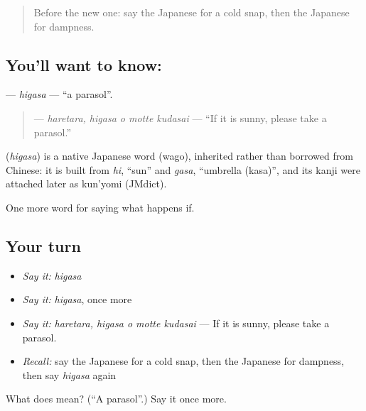 \label{lesson:JA-C354-higasa}



\begin{quote}
Before the new one: say the Japanese for a cold snap, then the Japanese for dampness.
\end{quote}

\subsection*{You'll want to know: }
\textbf{} — \emph{higasa} — \textquotedblleft{}a parasol\textquotedblright{}.

\begin{quote}
\textbf{  } — \emph{haretara, higasa o motte kudasai} — \textquotedblleft{}If it is sunny, please take a parasol.\textquotedblright{}
\end{quote}

\begin{cousinweb}
\textbf{} (\emph{higasa}) is a native Japanese word (wago), inherited rather than borrowed from Chinese: it is built from \emph{hi}, \textquotedblleft{}sun\textquotedblright{} and \emph{gasa}, \textquotedblleft{}umbrella (kasa)\textquotedblright{}, and its kanji were attached later as kun'yomi (JMdict).
\end{cousinweb}

\begin{grammarlens}[title={What you've built}]
One more word for saying what happens if.
\end{grammarlens}

\subsection*{Your turn}
\begin{itemize}
\raggedright
  \item \emph{Say it:} \emph{higasa}
  \item \emph{Say it:} \emph{higasa}, once more
  \item \emph{Say it:} \emph{haretara, higasa o motte kudasai} — If it is sunny, please take a parasol.
  \item \emph{Recall:} say the Japanese for a cold snap, then the Japanese for dampness, then say \emph{higasa} again
\end{itemize}

\begin{tcolorbox}[breakable,colback=teal!4,colframe=teal!35!black,title={Before you move on}]
What does  mean? (\textquotedblleft{}A parasol\textquotedblright{}.) Say it once more.
\end{tcolorbox}
